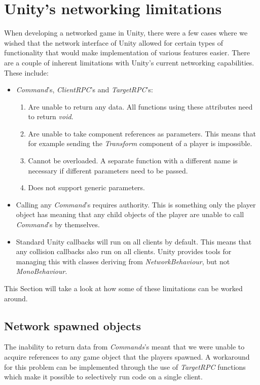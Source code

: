 \section{Unity's networking limitations}
\label{sec:networkLimitations}
When developing a networked game in Unity, there were a few cases where we wished that the network interface of Unity allowed for certain types of functionality that would make implementation of various features easier. There are a couple of inherent limitations with Unity's current networking capabilities. These include:
\begin{itemize}
    \item \emph{Command}'s, \emph{ClientRPC}'s and \emph{TargetRPC}'s:
    \begin{enumerate}
        \item Are unable to return any data. All functions using these attributes need to return \emph{void}.
        \item Are unable to take component references as parameters. This means that for example sending the \emph{Transform} component of a player is impossible. 
        \item Cannot be overloaded. A separate function with a different name is necessary if different parameters need to be passed. 
        \item Does not support generic parameters. 
    \end{enumerate}
    
    \item Calling any \emph{Command}'s requires authority. This is something only the player object has meaning that any child objects of the player are unable to call \emph{Command}'s by themselves. 
    
    \item Standard Unity callbacks will run on all clients by default. This means that any collision callbacks also run on all clients. Unity provides tools for managing this with classes deriving from \emph{NetworkBehaviour}, but not \emph{MonoBehaviour}. 
\end{itemize}

This Section will take a look at how some of these limitations can be worked around. 

\subsection{Network spawned objects}
The inability to return data from \emph{Commands}'s meant that we were unable to acquire references to any game object that the players spawned. A workaround for this problem can be implemented through the use of \emph{TargetRPC} functions which make it possible to selectively run code on a single client. 


